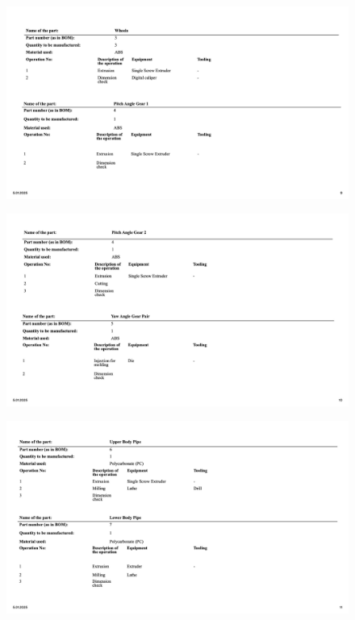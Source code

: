 \documentclass[12pt]{article}
\begin{document}
\begin{appendices}
\begin{figure}[H]
    \centering
    \includegraphics[width=\textwidth]{Slide9.jpeg} 
    \label{fig:route-sheet}
\end{figure}

\begin{figure}[H]
    \centering
    \includegraphics[width=\textwidth]{Slide10.jpeg} 
    \label{fig:route-sheet}
\end{figure}

\begin{figure}[H]
    \centering
    \includegraphics[width=\textwidth]{Slide11.jpeg} 
    \label{fig:route-sheet}
\end{figure}


\end{appendices}
\end{document}
